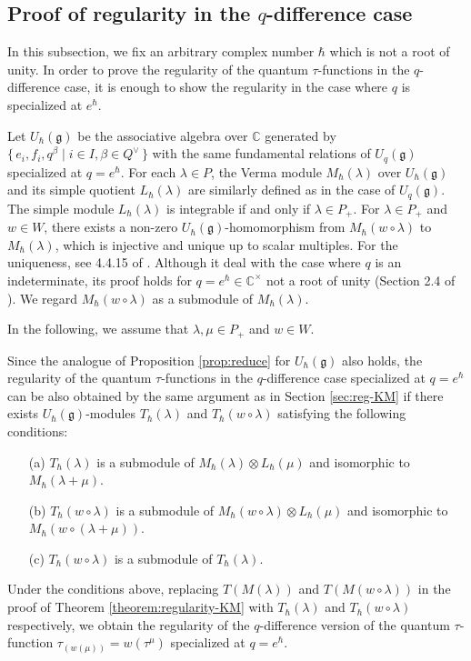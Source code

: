 \documentclass[12pt,twoside]{article}
\newcommand\Qv{Q^\vee}
\newcommand\g{{\mathfrak g}}
\newcommand\C{{\mathbb C}} %
\theoremstyle{plain} %
\theoremstyle{definition} %
\theoremstyle{definition} %
\numberwithin{theorem}{section}
\numberwithin{equation}{section}
\numberwithin{figure}{section}
\numberwithin{table}{section}
\newcommand\secref[1]{Section \ref{#1}}
\newcommand\theoremref[1]{Theorem \ref{#1}}
\newcommand\propref[1]{Proposition \ref{#1}}
\begin{document}

\subsection{Proof of regularity in the $q$-difference case}
\label{sec:reg-q}

In this subsection, we fix an arbitrary complex number $\hbar$ which is not a root of unity.
In order to prove the regularity of the quantum $\tau$-functions
in the $q$-difference case, it is enough to show 
the regularity in the case where $q$ is specialized at $e^\hbar$.

Let $U_\hbar(\g)$ be the associative algebra over $\C$ generated by 
$\{\,e_i,f_i,q^\beta\mid i\in I, \beta\in\Qv \,\}$ with the same fundamental
relations of $U_q(\g)$ specialized at $q=e^\hbar$. 
For each $\lambda\in P$, the Verma module $M_\hbar(\lambda)$ over $U_\hbar(\g)$ and 
its simple quotient $L_\hbar(\lambda)$ are similarly defined 
as in the case of $U_q(\g)$.
The simple module $L_\hbar(\lambda)$ is integrable if and only if $\lambda\in P_+$.
For $\lambda\in P_+$ and $w\in W$, there exists a non-zero $U_\hbar(\g)$-homomorphism 
from $M_\hbar(w\circ\lambda)$ to $M_\hbar(\lambda)$,  
which is injective and unique up to scalar multiples.
For the uniqueness, see 4.4.15 of \cite{Jos-1995}.
Although it deal with the case where $q$ is an indeterminate,
its proof holds for $q=e^\hbar\in\C^\times$ not a root of unity
(Section 2.4 of \cite{HK-2007}).
We regard $M_\hbar(w\circ\lambda)$ as a submodule of $M_\hbar(\lambda)$.

In the following, we assume that $\lambda,\mu\in P_+$ and $w\in W$.

Since the analogue of \propref{prop:reduce} for $U_\hbar(\g)$ also holds,
the regularity of the quantum $\tau$-functions in the $q$-difference case
specialized at $q=e^\hbar$ can be also obtained by the same argument 
as in \secref{sec:reg-KM} 
if there exists $U_\hbar(\g)$-modules $T_\hbar(\lambda)$ and $T_\hbar(w\circ\lambda)$
satisfying the following conditions:
\begin{enumerate}
\item[(a)] $T_\hbar(\lambda)$ is a submodule 
  of $M_\hbar(\lambda)\otimes L_\hbar(\mu)$
  and isomorphic to $M_\hbar(\lambda+\mu)$.
\item[(b)] $T_\hbar(w\circ\lambda)$ is a submodule 
  of $M_\hbar(w\circ\lambda)\otimes L_\hbar(\mu)$
  and isomorphic to $M_\hbar(w\circ(\lambda+\mu))$.
\item[(c)] $T_\hbar(w\circ\lambda)$ is a submodule of $T_\hbar(\lambda)$.
\end{enumerate}
Under the conditions above, replacing $T(M(\lambda))$ and $T(M(w\circ\lambda))$
in the proof of \theoremref{theorem:regularity-KM} 
with $T_\hbar(\lambda)$ and $T_\hbar(w\circ\lambda)$ respectively, 
we obtain the regularity of the $q$-difference version of 
the quantum $\tau$-function $\tau_{(w(\mu))}=w(\tau^\mu)$ specialized at $q=e^\hbar$.
\end{document}
